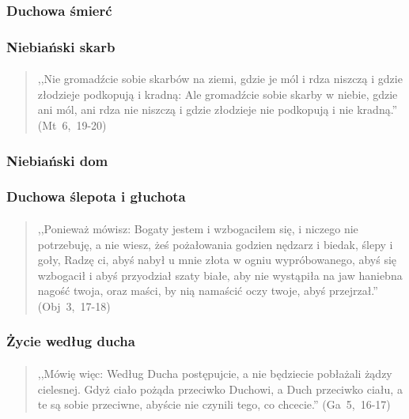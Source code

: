 \documentclass[10pt,a4paper,oneside]{article}
\begin{document}
\subsubsection{Duchowa śmierć}
\subsubsection{Niebiański skarb}
\paragraph{}
\begin{quote}
,,Nie gromadźcie sobie skarbów na ziemi, gdzie je mól i rdza niszczą i gdzie złodzieje podkopują i kradną: Ale gromadźcie sobie skarby w niebie, gdzie ani mól, ani rdza nie niszczą i gdzie złodzieje nie podkopują i nie kradną.'' \mbox{(Mt 6, 19-20)}
\end{quote}
\subsubsection{Niebiański dom}
\subsubsection{Duchowa ślepota i głuchota}
\paragraph{}
\begin{quote}
,,Ponieważ mówisz: Bogaty jestem i wzbogaciłem się, i niczego nie potrzebuję, a nie wiesz, żeś pożałowania godzien nędzarz i biedak, ślepy i goły, Radzę ci, abyś nabył u mnie złota w ogniu wypróbowanego, abyś się wzbogacił i abyś przyodział szaty białe, aby nie wystąpiła na jaw haniebna nagość twoja, oraz maści, by nią namaścić oczy twoje, abyś przejrzał.'' \mbox{(Obj 3, 17-18)}
\end{quote}
\subsubsection{Życie według ducha}
\paragraph{}
\begin{quote}
,,Mówię więc: Według Ducha postępujcie, a nie będziecie pobłażali żądzy cielesnej. Gdyż ciało pożąda przeciwko Duchowi, a Duch przeciwko ciału, a te są sobie przeciwne, abyście nie czynili tego, co chcecie.'' \mbox{(Ga 5, 16-17)}
\end{quote}
\end{document}
